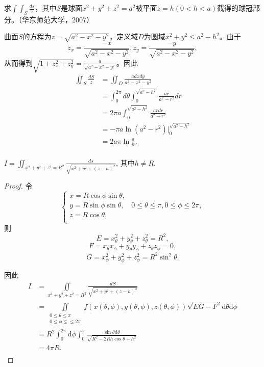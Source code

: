   \begin{exercise}
  求$\int\int_S\frac{ds}z$，其中$S$是球面$x^2+y^2+z^2=a^2$被平面$z=h(0<h<a)$截得的球冠部分。（华东师范大学，2007）  
  
   曲面$S$的方程为$z=\sqrt{a^2-x^2-y^2}$，定义域$D$为圆域$x^2+y^2\leq a^2-h^2$。由于$$z_x=\frac{-x}{\sqrt{a^2-x^2-y^2}},z_y=\frac{-y}{\sqrt{a^2-x^2-y^2}},$$
  从而得到$\sqrt{1+z_x^2+z_y^2}=\frac{a}{\sqrt{a^2-x^2-y^2}}$。因此
  \begin{align*}
  \iint_S\frac{dS}{z}&=\iint_D\frac{adxdy}{a^2-x^2-y^2}\\
  &=\int_0^{2\pi}d\theta\int_0^{\sqrt{a^2-h^2}}\frac{ar}{a^2-r^2}dr\\
  &=2\pi a\int_0^{\sqrt{a^2-h^2}}\frac{ardr}{a^2-r^2}\\
  &=-\pi a\ln(a^2-r^2)|_0^{\sqrt{a^2-h^2}}\\
  &=2a\pi\ln\frac{a}{h}.\\
  \end{align*} 
  \end{exercise}
  
  \begin{exercise}
   $I=\iint_{x^2+y^2+z^2=R^2}\frac{ds}{\sqrt{x^2+y^2+(z-h)^2}}$,
   其中$h\neq R$. %
  \end{exercise} 
  
  \begin{proof}
  令
  \[
	\begin{cases}
	x=R\cos\phi\sin\theta,&\\
	y=R\sin\phi\sin\theta,&0\leq\theta\leq\pi,0\leq\phi\leq2\pi,\\
	z=R\cos\theta,\\
	\end{cases}  
  \]
则$$E=x_{\theta}^2+y_{\theta}^2+z_{\theta}^2=R^2,$$
$$F=x_{\theta}x_{\phi}+y_{\theta}y_{\phi}+z_{\theta}z_{\phi}=0,$$
$$G=x_{\phi}^2+y_{\phi}^2+z_{\phi}^2=R^2\sin^2\theta.$$

因此
\begin{align*}
I&=\iint\limits_{x^2+y^2+z^2=R^2}\frac{dS}{\sqrt{x^2+y^2+(z-h)^2}}\\
&=\iint\limits_{\substack{0\leq\theta\leq\pi\\0\leq\phi\leq\leq2\pi}}f(x(\theta,\phi),y(\theta,\phi),z(\theta,\phi))\sqrt{EG-F^2}\mathrm{d}\theta\mathrm{d}\phi\\
&=R^2\int_0^{2\pi}\mathrm{d}\phi\int_0^{\pi}\frac{\sin\theta\mathrm{d}\theta}{\sqrt{R^2-2Rh\cos\theta+h^2}}\\
&=4\pi R.\\
\end{align*}
\end{proof}

